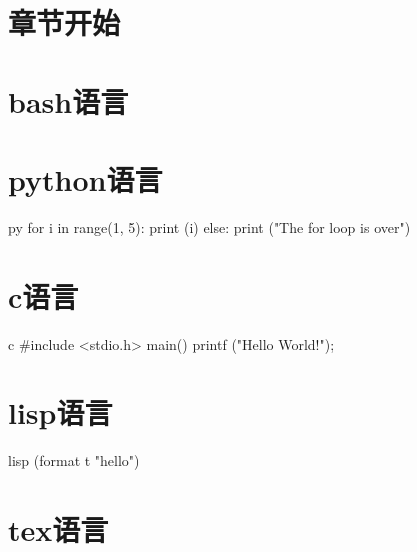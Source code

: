 \documentclass[11pt,oneside]{book}
\newlength{\textpt}
\newif\ifphone
\begin{document}
\begin{common-format}
\mainmatter

\chapter{章节开始}

\chapter{bash语言}

\chapter{python语言}
\begin{xverbatim}[129]{py}
for i in range(1, 5):
    print (i)
else:
    print ("The for loop is over")
\end{xverbatim}

\chapter{c语言}
\begin{xverbatim}[129]{c}
#include <stdio.h>
main()
{
printf ("Hello World!\n");
}
\end{xverbatim}

\chapter{lisp语言}
\begin{xverbatim}[129]{lisp}
(format t "hello")
\end{xverbatim}

\chapter{tex语言}
\end{common-format}
\end{document}
